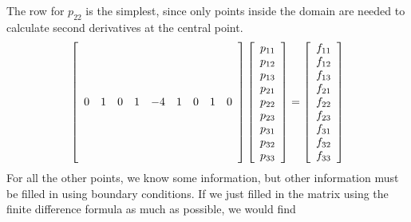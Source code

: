 \documentclass[12pt]{article}
\begin{document}
The row for $p_{22}$ is the simplest, since only points inside the domain are needed to calculate second derivatives at the central point.
\[ \left[ \begin{array}{c c c c c c c c c} \\ \\ \\ \\ 0&1&0&1&-4&1&0&1&0 \\ \\ \\ \\ \\ \end{array} \right] \left[ \begin{array}{c} p_{11}\\p_{12}\\p_{13}\\p_{21}\\p_{22}\\p_{23}\\p_{31}\\p_{32}\\p_{33}\\ \end{array}\right] = \left[ \begin{array}{c} f_{11}\\f_{12}\\f_{13}\\f_{21}\\f_{22}\\f_{23}\\f_{31}\\f_{32}\\f_{33}\\ \end{array}\right]
\]
For all the other points, we know some information, but other information must be filled in using boundary conditions.  If we just filled in the matrix using the finite difference formula as much as possible, we would find
\end{document}
